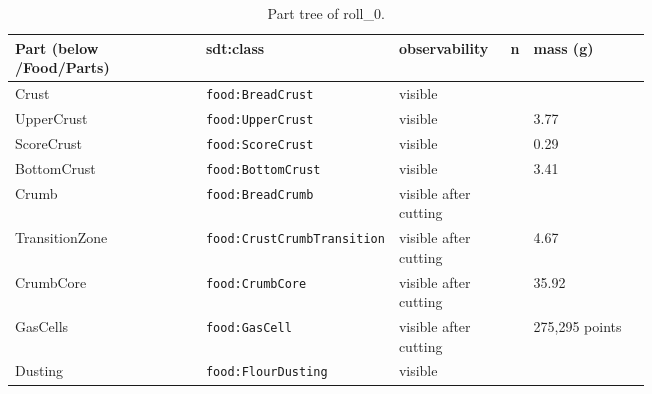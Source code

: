 \documentclass[10.5pt,a4paper]{article}
\begin{document}
\begin{table}[htbp]\centering\scriptsize\caption{Part tree of roll\_0.}
\begin{tabularx}{\linewidth}{@{}p{0.30\linewidth}p{0.27\linewidth}p{0.17\linewidth}rX@{}}\toprule Part (below /Food/Parts) & sdt:class & observability & n & mass (g) \\\midrule
\hspace*{0.0em}Crust & \texttt{food:BreadCrust} & visible &  &  \\
\hspace*{0.9em}UpperCrust & \texttt{food:UpperCrust} & visible &  & 3.77 \\
\hspace*{0.9em}ScoreCrust & \texttt{food:ScoreCrust} & visible &  & 0.29 \\
\hspace*{0.9em}BottomCrust & \texttt{food:BottomCrust} & visible &  & 3.41 \\
\hspace*{0.0em}Crumb & \texttt{food:BreadCrumb} & visible after cutting &  &  \\
\hspace*{0.9em}TransitionZone & \texttt{food:CrustCrumbTransition} & visible after cutting &  & 4.67 \\
\hspace*{0.9em}CrumbCore & \texttt{food:CrumbCore} & visible after cutting &  & 35.92 \\
\hspace*{0.9em}GasCells & \texttt{food:GasCell} & visible after cutting &  & 275,295 points \\
\hspace*{0.0em}Dusting & \texttt{food:FlourDusting} & visible &  &  \\\bottomrule\end{tabularx}\end{table}
\end{document}
